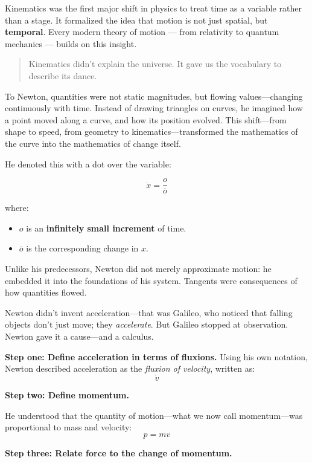     Kinematics was the first major shift in physics to treat time as a variable rather than a stage. It formalized the idea that motion is not just spatial, but \textbf{temporal}. Every modern theory of motion — from relativity to quantum mechanics — builds on this insight.
    
    \begin{quote}
    Kinematics didn’t explain the universe.  It gave us the vocabulary to describe its dance.
    \end{quote}

To Newton, quantities were not static magnitudes, but flowing values—changing continuously with time. Instead of drawing triangles on curves, he imagined how a point moved along a curve, and how its position evolved. This shift—from shape to speed, from geometry to kinematics—transformed the mathematics of the curve into the mathematics of change itself.

He denoted this with a dot over the variable:

\[
\dot{x} = \frac{o}{\bar{o}}
\]

where:

\begin{itemize}
    \item \( o \) is an \textbf{infinitely small increment} of time.  
    \item \( \bar{o} \) is the corresponding change in \( x \).
\end{itemize}


  

Unlike his predecessors, Newton did not merely approximate motion: he embedded it into the foundations of his system. Tangents were consequences of how quantities flowed.

  Newton didn’t invent acceleration—that was Galileo, who noticed that falling objects don’t just move; they \textit{accelerate}. But Galileo stopped at observation. Newton gave it a cause—and a calculus.
  
  \textbf{Step one: Define acceleration in terms of fluxions.}  
  Using his own notation, Newton described acceleration as the \textit{fluxion of velocity}, written as:
  \[
  \dot{v}
  \]
  
  \textbf{Step two: Define momentum.}  

  He understood that the quantity of motion—what we now call momentum—was proportional to mass and velocity:
  \[
  p = m v
  \]
  
  \textbf{Step three: Relate force to the change of momentum.}  

